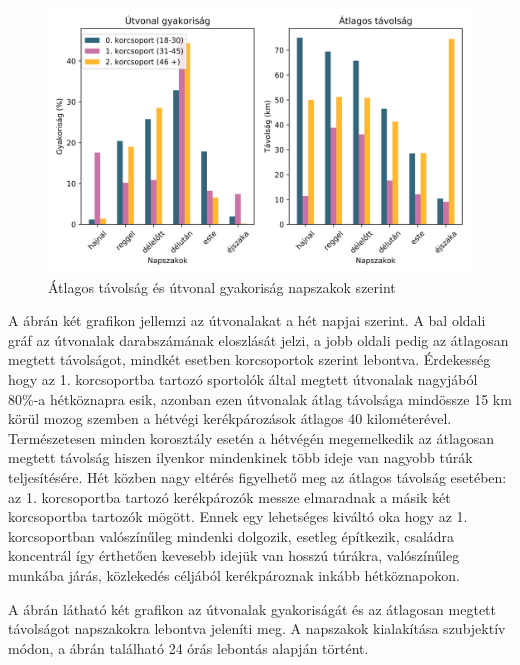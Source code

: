 \begin{figure}
	\centering
	\includegraphics[width=\linewidth,keepaspectratio]{kepek/data_insights/FrequencyAndDistanceOnDayparts.png}
	\caption{Átlagos távolság és útvonal gyakoriság napszakok szerint}
	\label{fig:distanceAndFrequencyByDayparts}
\end{figure}


A  ábrán két grafikon jellemzi az útvonalakat a hét napjai szerint. A bal oldali gráf az útvonalak darabszámának eloszlását jelzi, a jobb oldali pedig az átlagosan megtett távolságot, mindkét esetben korcsoportok szerint lebontva. Érdekesség hogy az 1. korcsoportba tartozó sportolók által megtett útvonalak nagyjából 80\%-a hétköznapra esik, azonban ezen útvonalak átlag távolsága mindössze 15 km körül mozog szemben a hétvégi kerékpározások átlagos 40 kilométerével. Természetesen minden korosztály esetén a hétvégén megemelkedik az átlagosan megtett távolság hiszen ilyenkor mindenkinek több ideje van nagyobb túrák teljesítésére. Hét közben nagy eltérés figyelhető meg az átlagos távolság esetében: az 1. korcsoportba tartozó kerékpározók messze elmaradnak a másik két korcsoportba tartozók mögött. Ennek egy lehetséges kiváltó oka hogy az 1. korcsoportban valószínűleg mindenki dolgozik, esetleg építkezik, családra koncentrál így érthetően kevesebb idejük van hosszú túrákra, valószínűleg munkába járás, közlekedés céljából kerékpároznak inkább hétköznapokon.


A  ábrán látható két grafikon az útvonalak gyakoriságát és az átlagosan megtett távolságot napszakokra lebontva jeleníti meg. A napszakok kialakítása szubjektív módon, a  ábrán található 24 órás lebontás alapján történt. 


